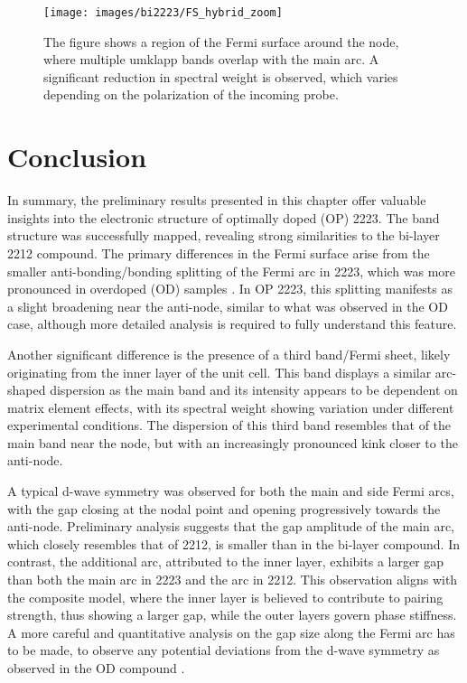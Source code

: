 \begin{figure}[h!]
	\centering
	\texttt{[image: images/bi2223/FS\_hybrid\_zoom]}
	\caption{The figure shows a region of the Fermi surface around the node, where multiple umklapp bands overlap with the main arc. A significant reduction in spectral weight is observed, which varies depending on the polarization of the incoming probe.}
	\label{fig:fs_hybrid}
\end{figure}

\section{Conclusion}

In summary, the preliminary results presented in this chapter offer valuable insights into the electronic structure of optimally doped (OP) 2223.
The band structure was successfully mapped, revealing strong similarities to the bi-layer 2212 compound.
The primary differences in the Fermi surface arise from the smaller anti-bonding/bonding splitting of the Fermi arc in 2223, which was more pronounced in overdoped (OD) samples \cite{luo_electronic_2023}.
In OP 2223, this splitting manifests as a slight broadening near the anti-node, similar to what was observed in the OD case, although more detailed analysis is required to fully understand this feature.

Another significant difference is the presence of a third band/Fermi sheet, likely originating from the inner  layer of the unit cell.
This band displays a similar arc-shaped dispersion as the main band and its intensity appears to be dependent on matrix element effects, with its spectral weight showing variation under different experimental conditions.
The dispersion of this third band resembles that of the main band near the node, but with an increasingly pronounced kink closer to the anti-node.

A typical d-wave symmetry was observed for both the main and side Fermi arcs, with the gap closing at the nodal point and opening progressively towards the anti-node.
Preliminary analysis suggests that the gap amplitude of the main arc, which closely resembles that of 2212, is smaller than in the bi-layer compound.
In contrast, the additional arc, attributed to the inner  layer, exhibits a larger gap than both the main arc in 2223 and the arc in 2212.
This observation aligns with the composite model, where the inner layer is believed to contribute to pairing strength, thus showing a larger gap, while the outer layers govern phase stiffness.
A more careful and quantitative analysis on the gap size along the Fermi arc has to be made, to observe any potential deviations from the d-wave symmetry as observed in the OD compound \cite{luo_electronic_2023}.

